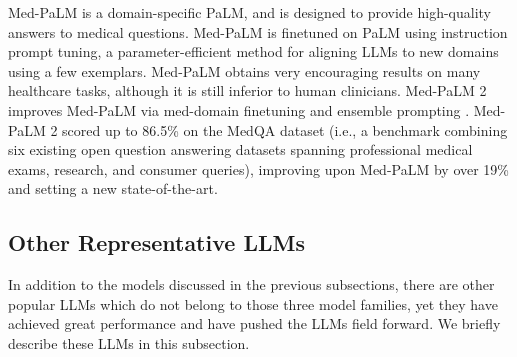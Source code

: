 \documentclass[conference]{IEEEtran}
\begin{document}

Med-PaLM \cite{singhal2022large} is a domain-specific PaLM, and is designed to provide high-quality answers to medical questions.
Med-PaLM is finetuned on PaLM using instruction prompt tuning, a parameter-efficient method for aligning LLMs to new domains using a few exemplars.
Med-PaLM obtains very encouraging results on many healthcare tasks, although it is still inferior to human clinicians.
Med-PaLM 2 improves Med-PaLM via med-domain finetuning and ensemble prompting \cite{singhal2023towards}. Med-PaLM 2 scored up to 86.5\% on the MedQA dataset (i.e., a benchmark combining six existing open question answering datasets spanning professional medical exams, research, and consumer queries), improving upon Med-PaLM by over 19\% and setting a new state-of-the-art. 




\subsection{Other Representative LLMs}
In addition to the models discussed in the previous subsections, there are other popular LLMs which do not belong to those three model families, yet they have achieved great performance and have pushed the LLMs field forward.
We briefly describe these LLMs in this subsection.
\end{document}
